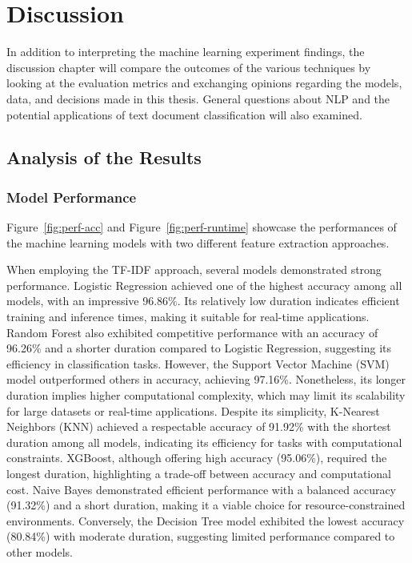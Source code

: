 \chapter{Discussion}

In addition to interpreting the machine learning experiment findings, the discussion chapter will compare the outcomes of the various techniques by looking at the evaluation metrics and exchanging opinions regarding the models, data, and decisions made in this thesis. General questions about NLP and the potential applications of text document classification will also examined.

\section{Analysis of the Results}

\subsection{Model Performance}

Figure~\ref{fig:perf-acc} and Figure~\ref{fig:perf-runtime} showcase the performances of the machine learning models with two different feature extraction approaches.

When employing the TF-IDF approach, several models demonstrated strong performance. Logistic Regression achieved one of the highest accuracy among all models, with an impressive 96.86\%. Its relatively low duration indicates efficient training and inference times, making it suitable for real-time applications. Random Forest also exhibited competitive performance with an accuracy of 96.26\% and a shorter duration compared to Logistic Regression, suggesting its efficiency in classification tasks. However, the Support Vector Machine (SVM) model outperformed others in accuracy, achieving 97.16\%. Nonetheless, its longer duration implies higher computational complexity, which may limit its scalability for large datasets or real-time applications. Despite its simplicity, K-Nearest Neighbors (KNN) achieved a respectable accuracy of 91.92\% with the shortest duration among all models, indicating its efficiency for tasks with computational constraints. XGBoost, although offering high accuracy (95.06\%), required the longest duration, highlighting a trade-off between accuracy and computational cost. Naive Bayes demonstrated efficient performance with a balanced accuracy (91.32\%) and a short duration, making it a viable choice for resource-constrained environments. Conversely, the Decision Tree model exhibited the lowest accuracy (80.84\%) with moderate duration, suggesting limited performance compared to other models.

